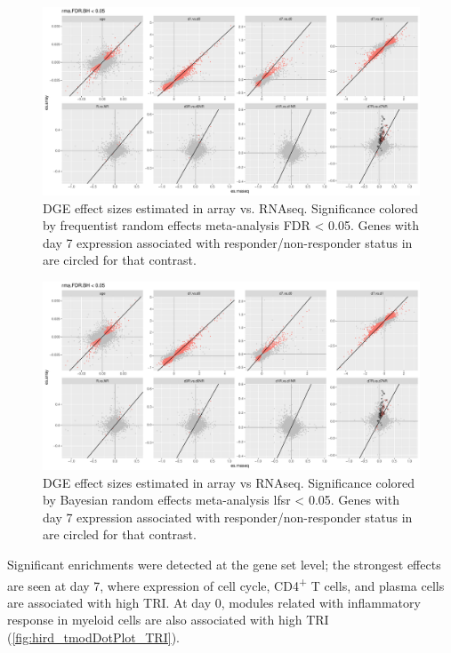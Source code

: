 \begin{figure}
    \includegraphics[width=1.0\textwidth,page=1]{mainmatter/figures/chapter_02/plot_dge_eqtl.DGE.effectSizeComparison.pdf}
    \caption{DGE effect sizes estimated in array vs. \gls{RNAseq}. Significance colored by frequentist random effects meta-analysis FDR < 0.05. Genes with day 7 expression associated with responder/non-responder status in \autocite{sobolev2016AdjuvantedInfluenzaH1N1Vaccination} are circled for that contrast.}
    \label{fig:hird_DGE_effectSizeComparisons_rma}
\end{figure}

\begin{figure}
    \includegraphics[width=1.0\textwidth,page=2]{mainmatter/figures/chapter_02/plot_dge_eqtl.DGE.effectSizeComparison.pdf}
    \caption{DGE effect sizes estimated in array vs \gls{RNAseq}. Significance colored by Bayesian random effects meta-analysis lfsr < 0.05. Genes with day 7 expression associated with responder/non-responder status in \autocite{sobolev2016AdjuvantedInfluenzaH1N1Vaccination} are circled for that contrast.}
    \label{fig:hird_DGE_effectSizeComparisons_bayesmeta}
\end{figure}

Significant enrichments were detected at the gene set level; the strongest effects are seen at day 7, where expression of cell cycle, CD4\textsuperscript{+} T cells, and plasma cells are associated with high \gls{TRI}.
At day 0, modules related with inflammatory response in myeloid cells are also associated with high \gls{TRI} (\autoref{fig:hird_tmodDotPlot_TRI}).

